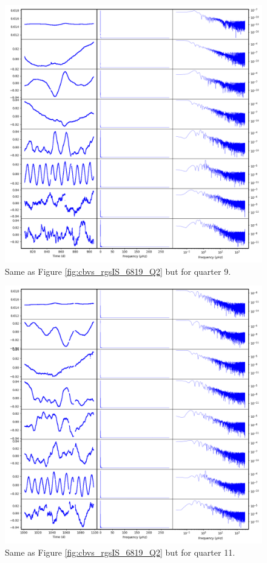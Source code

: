 \begin{figure}
    \centering
    \includegraphics[width=\linewidth]{Chapter_Appended/AppB/cbv_6819_rgs_q09.png}
    \caption{Same as Figure \ref{fig:cbvs_rgsIS_6819_Q2} but for quarter 9.}
    \label{fig:cbvs_rgsIS_6819_Q09}
\end{figure}


\begin{figure}
    \centering
    \includegraphics[width=\linewidth]{Chapter_Appended/AppB/cbv_6819_rgs_q11.png}
    \caption{Same as Figure \ref{fig:cbvs_rgsIS_6819_Q2} but for quarter 11.}
    \label{fig:cbvs_rgsIS_6819_Q11}
\end{figure}


